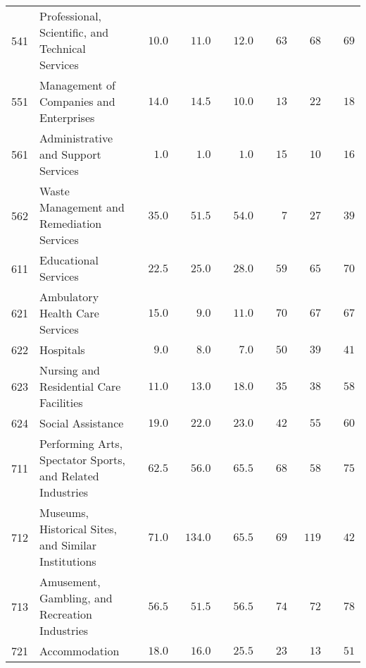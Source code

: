 \documentclass[9pt, oneside]{article}   	%
\begin{document}
\begin{longtable}{lp{3in}cccccc}
541  & Professional, Scientific, and Technical Services & $\phantom{00}10.0$ & $\phantom{00}11.0$ & $\phantom{00}12.0$ & $\phantom{00}63$ & $\phantom{00}68$ & $\phantom{00}69$ \\
551  & Management of Companies and Enterprises & $\phantom{00}14.0$ & $\phantom{00}14.5$ & $\phantom{00}10.0$ & $\phantom{00}13$ & $\phantom{00}22$ & $\phantom{00}18$ \\
561  & Administrative and Support Services & $\phantom{000}1.0$ & $\phantom{000}1.0$ & $\phantom{000}1.0$ & $\phantom{00}15$ & $\phantom{00}10$ & $\phantom{00}16$ \\
562  & Waste Management and Remediation Services & $\phantom{00}35.0$ & $\phantom{00}51.5$ & $\phantom{00}54.0$ & $\phantom{000}7$ & $\phantom{00}27$ & $\phantom{00}39$ \\
611  & Educational Services & $\phantom{00}22.5$ & $\phantom{00}25.0$ & $\phantom{00}28.0$ & $\phantom{00}59$ & $\phantom{00}65$ & $\phantom{00}70$ \\
621  & Ambulatory Health Care Services & $\phantom{00}15.0$ & $\phantom{000}9.0$ & $\phantom{00}11.0$ & $\phantom{00}70$ & $\phantom{00}67$ & $\phantom{00}67$ \\
622  & Hospitals & $\phantom{000}9.0$ & $\phantom{000}8.0$ & $\phantom{000}7.0$ & $\phantom{00}50$ & $\phantom{00}39$ & $\phantom{00}41$ \\
623  & Nursing and Residential Care Facilities & $\phantom{00}11.0$ & $\phantom{00}13.0$ & $\phantom{00}18.0$ & $\phantom{00}35$ & $\phantom{00}38$ & $\phantom{00}58$ \\
624  & Social Assistance & $\phantom{00}19.0$ & $\phantom{00}22.0$ & $\phantom{00}23.0$ & $\phantom{00}42$ & $\phantom{00}55$ & $\phantom{00}60$ \\
711  & Performing Arts, Spectator Sports, and Related Industries & $\phantom{00}62.5$ & $\phantom{00}56.0$ & $\phantom{00}65.5$ & $\phantom{00}68$ & $\phantom{00}58$ & $\phantom{00}75$ \\
712  & Museums, Historical Sites, and Similar Institutions & $\phantom{00}71.0$ & $\phantom{0}134.0$ & $\phantom{00}65.5$ & $\phantom{00}69$ & $\phantom{0}119$ & $\phantom{00}42$ \\
713  & Amusement, Gambling, and Recreation Industries & $\phantom{00}56.5$ & $\phantom{00}51.5$ & $\phantom{00}56.5$ & $\phantom{00}74$ & $\phantom{00}72$ & $\phantom{00}78$ \\
721  & Accommodation & $\phantom{00}18.0$ & $\phantom{00}16.0$ & $\phantom{00}25.5$ & $\phantom{00}23$ & $\phantom{00}13$ & $\phantom{00}51$ \\

\end{longtable}
\end{document}
